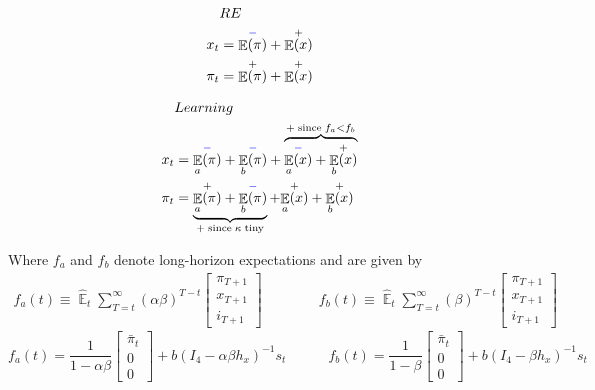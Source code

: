 \documentclass[11pt]{article}
\renewcommand{\[}{\begin{equation}}
\renewcommand{\]}{\end{equation}}
\DeclareMathOperator{\E}{\mathbb{E}}
\begin{document}
\vspace{-0.9cm}

\begin{multicols}{2}
\begin{align*}
& RE \\
x_t & = \overset{\textcolor{blue}{-}}{\E(\pi)} + \overset{+}{\E(x)} \\  
\pi_t & = \overset{+}{\E(\pi)} + \overset{+}{\E(x)} 
\end{align*}
\columnbreak

\vspace{0.1cm}

\begin{align*}
& Learning \\
x_t & = \overset{\textcolor{blue}{-}}{\E_a(\pi)}  + \overset{\textcolor{blue}{-}}{\E_b(\pi)}  
+ \overbrace{\overset{\textcolor{blue}{-}}{\E_a(x)}   + \overset{+}{\E_b(x)}}^{+ \; \text{since} \; f_a < f_b}   \\  
\pi_t & = \underbrace{\overset{+}{\E_a(\pi)} + \overset{\textcolor{blue}{-}}{\E_b(\pi)}}_{+ \; \text{since} \; \kappa \; \text{tiny}} 
+ \overset{+}{\E_a(x)} + \overset{+}{\E_b(x)}
\end{align*}
\end{multicols}

Where $f_a$ and $f_b$ denote long-horizon expectations and are given by
\begin{align}
f_a(t)  \equiv  \hat{\E}_t\sum_{T=t}^{\infty} (\alpha\beta)^{T-t } \begin{bmatrix} \pi_{T+1} \\ x_{T+1} \\ i_{T+1} \end{bmatrix} \quad \quad \quad \quad f_b(t)  \equiv \hat{\E}_t\sum_{T=t}^{\infty} (\beta)^{T-t } \begin{bmatrix} \pi_{T+1} \\ x_{T+1} \\ i_{T+1} \end{bmatrix}
\end{align}
\begin{equation}
f_a(t) = \frac{1}{1-\alpha\beta}\begin{bmatrix} \bar{\pi}_t \\ 0 \\ 0 \end{bmatrix} + b(I_4 - \alpha\beta h_x)^{-1}s_t \quad \quad \quad f_b(t) = \frac{1}{1-\beta}\begin{bmatrix} \bar{\pi}_t \\ 0 \\ 0 \end{bmatrix}  + b(I_4 - \beta h_x)^{-1}s_t  \label{fafb_obvious}
\end{equation}
\end{document}
